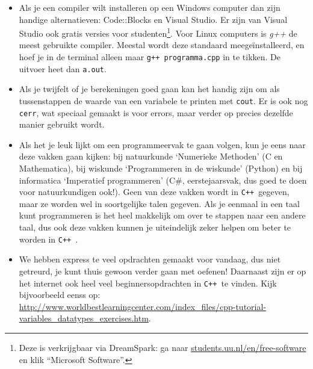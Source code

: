 \documentclass[12pt,a4paper]{article}
\newcommand{\icode}{\lstinline}
\newcommand{\mono}{\texttt}
\newcommand{\cpp}{\mono{C++ }}
\begin{document}
\begin{itemize}
	\item Als je een compiler wilt installeren op een Windows computer dan zijn handige alternatieven: Code::Blocks en Visual Studio. Er zijn van Visual Studio ook gratis versies voor studenten\footnote{Deze is verkrijgbaar via DreamSpark: ga naar \url{students.uu.nl/en/free-software} en klik ``Microsoft Software''.}.
		Voor Linux computers is \emph{g++} de meest gebruikte compiler. Meestal wordt deze standaard meegeïnstalleerd, en hoef je in de terminal alleen maar \mono{g++ programma.cpp} in te tikken. De uitvoer heet dan \mono{a.out}.
	\item Als je twijfelt of je berekeningen goed gaan kan het handig zijn om als tussenstappen de waarde van een variabele te printen met \icode{cout}. Er is ook nog \icode{cerr}, wat speciaal gemaakt is voor errors, maar verder op precies dezelfde manier gebruikt wordt.
	\item Als het je leuk lijkt om een programmeervak te gaan volgen, kun je eens naar deze vakken gaan kijken: bij natuurkunde `Numerieke Methoden' (C en Mathematica), bij wiskunde `Programmeren in de wiskunde' (Python) en bij informatica `Imperatief programmeren' (C\#, eerstejaarsvak, dus goed te doen voor natuurkundigen ook!). Geen van deze vakken wordt in \cpp gegeven, maar ze worden wel in soortgelijke talen gegeven. Als je eenmaal in een taal kunt programmeren is het heel makkelijk om over te stappen naar een andere taal, dus ook deze vakken kunnen je uiteindelijk zeker helpen om beter te worden in \cpp. 
	\item We hebben express te veel opdrachten gemaakt voor vandaag, dus niet getreurd, je kunt thuis gewoon verder gaan met oefenen! Daarnaast zijn er op het internet ook heel veel beginnersopdrachten in \cpp te vinden. Kijk bijvoorbeeld eenss op: \url{http://www.worldbestlearningcenter.com/index_files/cpp-tutorial-variables_datatypes_exercises.htm}.
\end{itemize}
\end{document}
